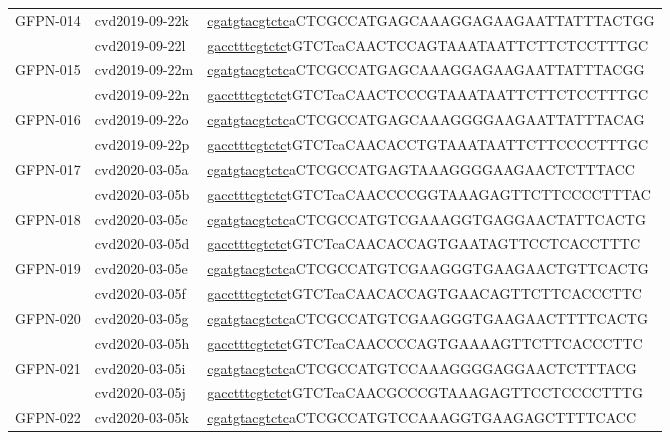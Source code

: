 \begin{landscape}
\begin{longtable}{|l|l|l|}
		\multirow{2}{*}{GFPN-014} & cvd2019-09-22k & \underline{cgatgta\underline{cgtctc}}aCTCGCCATGAGCAAAGGAGAAGAATTATTTACTGG  \\ \cline{2-3} 
		& cvd2019-09-22l & \underline{gaccttt\underline{cgtctc}}tGTCTcaCAACTCCAGTAAATAATTCTTCTCCTTTGC \\ \hline
		\multirow{2}{*}{GFPN-015} & cvd2019-09-22m & \underline{cgatgta\underline{cgtctc}}aCTCGCCATGAGCAAAGGAGAAGAATTATTTACGG   \\ \cline{2-3} 
		& cvd2019-09-22n & \underline{gaccttt\underline{cgtctc}}tGTCTcaCAACTCCCGTAAATAATTCTTCTCCTTTGC \\ \hline
		\multirow{2}{*}{GFPN-016} & cvd2019-09-22o & \underline{cgatgta\underline{cgtctc}}aCTCGCCATGAGCAAAGGGGAAGAATTATTTACAG   \\ \cline{2-3} 
		& cvd2019-09-22p & \underline{gaccttt\underline{cgtctc}}tGTCTcaCAACACCTGTAAATAATTCTTCCCCTTTGC \\ \hline
		\multirow{2}{*}{GFPN-017} & cvd2020-03-05a & \underline{cgatgta\underline{cgtctc}}aCTCGCCATGAGTAAAGGGGAAGAACTCTTTACC    \\ \cline{2-3} 
		& cvd2020-03-05b & \underline{gaccttt\underline{cgtctc}}tGTCTcaCAACCCCGGTAAAGAGTTCTTCCCCTTTAC \\ \hline
		\multirow{2}{*}{GFPN-018} & cvd2020-03-05c & \underline{cgatgta\underline{cgtctc}}aCTCGCCATGTCGAAAGGTGAGGAACTATTCACTG   \\ \cline{2-3} 
		& cvd2020-03-05d & \underline{gaccttt\underline{cgtctc}}tGTCTcaCAACACCAGTGAATAGTTCCTCACCTTTC  \\ \hline
		\multirow{2}{*}{GFPN-019} & cvd2020-03-05e & \underline{cgatgta\underline{cgtctc}}aCTCGCCATGTCGAAGGGTGAAGAACTGTTCACTG   \\ \cline{2-3} 
		& cvd2020-03-05f & \underline{gaccttt\underline{cgtctc}}tGTCTcaCAACACCAGTGAACAGTTCTTCACCCTTC  \\ \hline
		\multirow{2}{*}{GFPN-020} & cvd2020-03-05g & \underline{cgatgta\underline{cgtctc}}aCTCGCCATGTCGAAGGGTGAAGAACTTTTCACTG   \\ \cline{2-3} 
		& cvd2020-03-05h & \underline{gaccttt\underline{cgtctc}}tGTCTcaCAACCCCAGTGAAAAGTTCTTCACCCTTC  \\ \hline
		\multirow{2}{*}{GFPN-021} & cvd2020-03-05i & \underline{cgatgta\underline{cgtctc}}aCTCGCCATGTCCAAAGGGGAGGAACTCTTTACG    \\ \cline{2-3} 
		& cvd2020-03-05j & \underline{gaccttt\underline{cgtctc}}tGTCTcaCAACGCCCGTAAAGAGTTCCTCCCCTTTG  \\ \hline
		\multirow{2}{*}{GFPN-022} & cvd2020-03-05k & \underline{cgatgta\underline{cgtctc}}aCTCGCCATGTCCAAAGGTGAAGAGCTTTTCACC    \\ \cline{2-3} 

\end{longtable}
\end{landscape}
